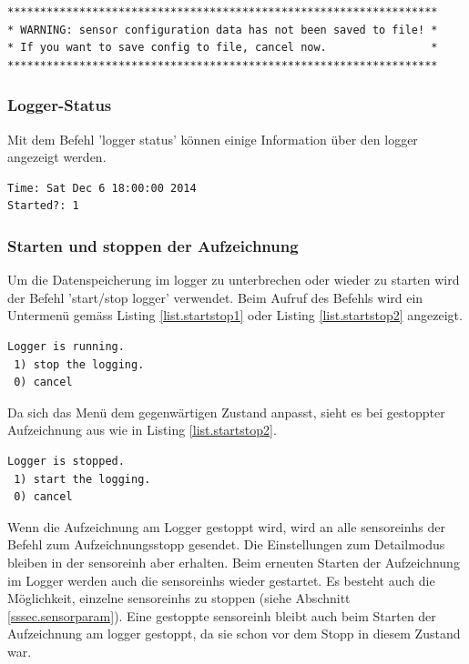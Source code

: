 \begin{lstlisting}[caption=Warnung vor SD-Karte abmelden bei ungespeicherter Konfiguration, label=list.sdunmountwarn]
******************************************************************
* WARNING: sensor configuration data has not been saved to file! *
* If you want to save config to file, cancel now.                *
******************************************************************
\end{lstlisting}

\subsubsection{Logger-Status}\label{sssec.loggerstate}
Mit dem Befehl 'logger status' können einige Information über den \gls{logger} angezeigt werden.

\begin{lstlisting}[caption=Untermenü Logger-Status, label=list.loggerstatus]
Time: Sat Dec 6 18:00:00 2014
Started?: 1
\end{lstlisting}


\subsubsection{Starten und stoppen der Aufzeichnung}\label{sssec.startstop}
Um die Datenspeicherung im \gls{logger} zu unterbrechen oder wieder zu starten wird der Befehl 'start/stop logger' verwendet. Beim Aufruf des Befehls wird ein Untermenü gemäss Listing \ref{list.startstop1} oder Listing \ref{list.startstop2} angezeigt.

\begin{lstlisting}[caption=Untermenü Stoppen der Aufzeichnung, label=list.startstop1]
 Logger is running.
 1) stop the logging.
 0) cancel
\end{lstlisting}

Da sich das Menü dem gegenwärtigen Zustand anpasst, sieht es bei gestoppter Aufzeichnung aus wie in Listing \ref{list.startstop2}.

\begin{lstlisting}[caption=Untermenü Starten der Aufzeichnung, label=list.startstop2]
 Logger is stopped.
 1) start the logging.
 0) cancel
\end{lstlisting}

Wenn die Aufzeichnung am Logger gestoppt wird, wird an alle \glspl{sensoreinh} der Befehl zum Aufzeichnungsstopp gesendet. Die Einstellungen zum Detailmodus bleiben in der \gls{sensoreinh} aber erhalten. Beim erneuten Starten der Aufzeichnung im Logger werden auch die \glspl{sensoreinh} wieder gestartet. Es besteht auch die Möglichkeit, einzelne \glspl{sensoreinh} zu stoppen (siehe Abschnitt \ref{sssec.sensorparam}). Eine gestoppte \gls{sensoreinh} bleibt auch beim Starten der Aufzeichnung am \gls{logger} gestoppt, da sie schon vor dem Stopp in diesem Zustand war.

